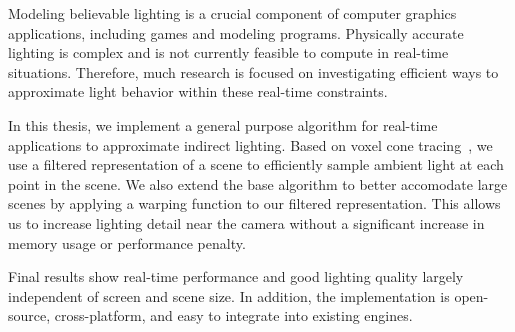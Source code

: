 Modeling believable lighting is a crucial component of computer graphics applications, including games and modeling programs. Physically accurate lighting is complex and is not currently feasible to compute in real-time situations. Therefore, much research is focused on investigating efficient ways to approximate light behavior within these real-time constraints.

In this thesis, we implement a general purpose algorithm for real-time applications to approximate indirect lighting. Based on voxel cone tracing~\cite{crassin2011interactive}, we use a filtered representation of a scene to efficiently sample ambient light at each point in the scene. We also extend the base algorithm to better accomodate large scenes by applying a warping function to our filtered representation. This allows us to increase lighting detail near the camera without a significant increase in memory usage or performance penalty.

Final results show real-time performance and good lighting quality largely independent of screen and scene size. In addition, the implementation is open-source, cross-platform, and easy to integrate into existing engines.